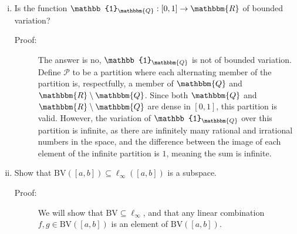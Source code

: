 \documentclass[10pt]{extarticle}
\newcommand{\Q}{\mathbbm{Q}}
\newcommand{\R}{\mathbbm{R}}
\begin{document}
  \begin{enumerate}[(i)]
    \item Is the function $\mathbb{1}_{\Q}: [0,1]\rightarrow \R$ of bounded variation?
      \begin{description}
        \item[Proof:] The answer is no, $\mathbb{1}_{\Q}$ is not of bounded variation. Define $\mathcal{P}$ to be a partition where each alternating member of the partition is, respectfully, a member of $\Q$ and $\R\setminus\Q$. Since both $\Q$ and $\R\setminus\Q$ are dense in $[0,1]$, this partition is valid. However, the variation of $\mathbb{1}_{\Q}$ over this partition is infinite, as there are infinitely many rational and irrational numbers in the space, and the difference between the image of each element of the infinite partition is $1$, meaning the sum is infinite.
      \end{description}
    \item Show that $\text{BV}([a,b])\subseteq \ell_{\infty}([a,b])$ is a subspace.
      \begin{description}
        \item[Proof:] We will show that $\text{BV}\subseteq \ell_{\infty}$, and that any linear combination $f,g\in \text{BV}([a,b])$ is an element of $\text{BV}([a,b])$.\\


\end{description}
\end{enumerate}
\end{document}
